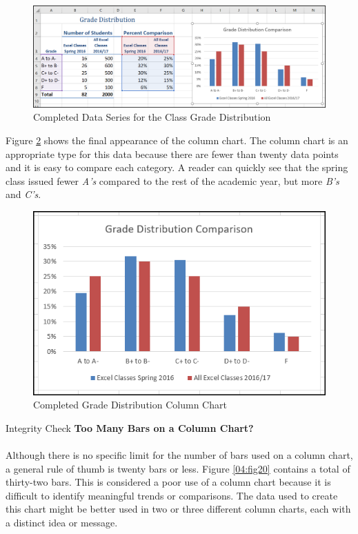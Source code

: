 \begin{figure}[H]
	\centering
	\includegraphics[width=\maxwidth{.95\linewidth}]{gfx/ch04_fig18}
	\caption{Completed Data Series for the Class Grade Distribution}
	\label{04:fig18}
\end{figure}

Figure \ref{04:fig19} shows the final appearance of the column chart. The column chart is an appropriate type for this data because there are fewer than twenty data points and it is easy to compare each category. A reader can quickly see that the spring class issued fewer \textit{A's} compared to the rest of the academic year, but more \textit{B's} and \textit{C's}.

\begin{figure}[H]
	\centering
	\includegraphics[width=\maxwidth{.95\linewidth}]{gfx/ch04_fig19}
	\caption{Completed Grade Distribution Column Chart}
	\label{04:fig19}
\end{figure}

\begin{center}
	\begin{infobox}{Integrity Check}
		\textbf{Too Many Bars on a Column Chart?}
		\\
		\\
		 Although there is no specific limit for the number of bars used on a column chart, a general rule of thumb is twenty bars or less. Figure \ref{04:fig20} contains a total of thirty-two bars. This is considered a poor use of a column chart because it is difficult to identify meaningful trends or comparisons. The data used to create this chart might be better used in two or three different column charts, each with a distinct idea or message.
	\end{infobox}
\end{center}

